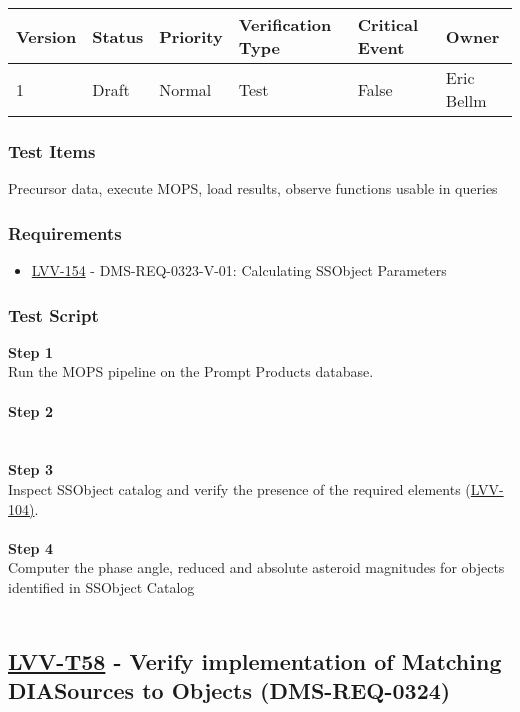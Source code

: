 \begin{longtable}[]{@{}llllll@{}}
\toprule
Version & Status & Priority & Verification Type & Critical Event &
Owner\tabularnewline
\midrule
\endhead
1 & Draft & Normal & Test & False & Eric Bellm\tabularnewline
\bottomrule
\end{longtable}

\hypertarget{test-items-33}{%
\subsubsection{Test Items}\label{test-items-33}}

Precursor data, execute MOPS, load results, observe functions usable in
queries

\hypertarget{requirements-34}{%
\subsubsection{Requirements}\label{requirements-34}}

\begin{itemize}
\tightlist
\item
  \href{https://jira.lsstcorp.org/browse/LVV-154}{LVV-154} -
  DMS-REQ-0323-V-01: Calculating SSObject Parameters
\end{itemize}

\hypertarget{test-script-34}{%
\subsubsection{Test Script}\label{test-script-34}}

\textbf{Step 1}\\
Run the MOPS pipeline on the Prompt Products database.\\
~\\
\textbf{Step 2}\\
~\\
~\\
\textbf{Step 3}\\
Inspect SSObject catalog and verify the presence of the required
elements
(​\href{https://jira.lsstcorp.org/browse/LVV-104}{LVV-104)}​​​.\\
~\\
\textbf{Step 4}\\
Computer the phase angle, reduced and absolute asteroid magnitudes for
objects identified in SSObject Catalog\\
~\\

\hypertarget{lvv-t58---verify-implementation-of-matching-diasources-to-objects-dms-req-0324}{%
\subsection{\texorpdfstring{\href{https://jira.lsstcorp.org/secure/Tests.jspa\#/testCase/LVV-T58}{LVV-T58}
- Verify implementation of Matching DIASources to Objects
(DMS-REQ-0324)}{LVV-T58 - Verify implementation of Matching DIASources to Objects (DMS-REQ-0324)}}\label{lvv-t58---verify-implementation-of-matching-diasources-to-objects-dms-req-0324}}

